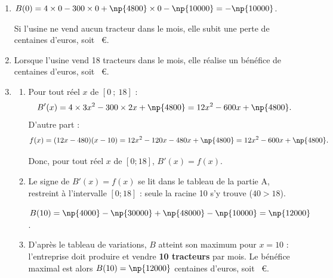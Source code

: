 \begin{enumerate}
	\item $B(0) = 4 \times 0 - 300 \times 0 + \np{4800} \times 0 - \np{10000} = -\np{10000}$.

	Si l'usine ne vend aucun tracteur dans le mois, elle subit une perte
	de  centaines d'euros, soit ~\euro.

	\item Lorsque l'usine vend 18 tracteurs dans le mois, elle réalise un bénéfice de 
	centaines d'euros, soit ~\euro.

	\item
	\begin{enumerate}
		\item Pour tout réel $x$ de $[0~;~18]$ :
		\[B'(x) = 4 \times 3x^2 - 300 \times 2x + \np{4800} = 12x^2 - 600x + \np{4800}.\]
		D'autre part :
		\[f(x) = (12x - 480)(x - 10) = 12x^2 - 120x - 480x + \np{4800} = 12x^2 - 600x + \np{4800}.\]

Donc, pour tout réel $x$ de $[0 ; 18]$, $B'(x) = f(x)$.

		\item Le signe de $B'(x) = f(x)$ se lit dans le tableau de la partie A, restreint à
		l'intervalle $[0 ; 18]$ : seule la racine 10 s'y trouve ($40 > 18$).

		$B(10) = \np{4000} - \np{30000} + \np{48000} - \np{10000} = \np{12000}$.

		\begin{center}
		\end{center}

		\item D'après le tableau de variations, $B$ atteint son maximum pour $x = 10$ : l'entreprise
		doit produire et vendre \textbf{10 tracteurs} par mois. Le bénéfice maximal est alors
		$B(10) = \np{12000}$ centaines d'euros, soit ~\euro.
	\end{enumerate}
\end{enumerate}

\medskip
